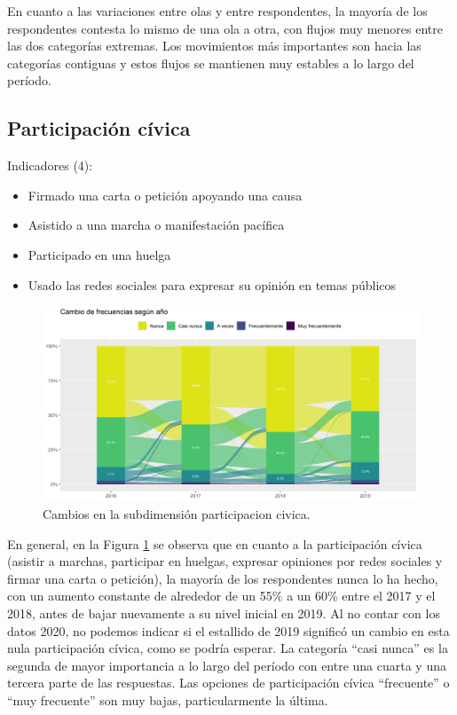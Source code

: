 \documentclass[
  12pt,
]{book}
\begin{document}
En cuanto a las variaciones entre olas y entre respondentes, la mayoría de los respondentes contesta lo mismo de una ola a otra, con flujos muy menores entre las dos categorías extremas. Los movimientos más importantes son hacia las categorías contiguas y estos flujos se mantienen muy estables a lo largo del período.

\hypertarget{participaciuxf3n-cuxedvica}{%
\subsection{Participación cívica}\label{participaciuxf3n-cuxedvica}}

Indicadores (4):

\begin{itemize}
\item
  Firmado una carta o petición apoyando una causa
\item
  Asistido a una marcha o manifestación pacífica
\item
  Participado en una huelga
\item
  Usado las redes sociales para expresar su opinión en temas públicos
\end{itemize}

\begin{figure}[H]

{\centering \includegraphics[width=1\linewidth,height=1\textheight]{output/graphs/alluvial_participacion} 

}

\caption{Cambios en la subdimensión participacion civica.}\label{fig:alluvial-participacion}
\end{figure}

En general, en la Figura \ref{fig:alluvial-participacion} se observa que en cuanto a la participación cívica (asistir a marchas, participar en huelgas, expresar opiniones por redes sociales y firmar una carta o petición), la mayoría de los respondentes nunca lo ha hecho, con un aumento constante de alrededor de un 55\% a un 60\% entre el 2017 y el 2018, antes de bajar nuevamente a su nivel inicial en 2019. Al no contar con los datos 2020, no podemos indicar si el estallido de 2019 significó un cambio en esta nula participación cívica, como se podría esperar. La categoría ``casi nunca'' es la segunda de mayor importancia a lo largo del período con entre una cuarta y una tercera parte de las respuestas. Las opciones de participación cívica ``frecuente'' o ``muy frecuente'' son muy bajas, particularmente la última.
\end{document}
